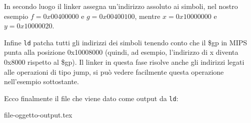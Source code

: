 \documentclass[class=book, crop=false, oneside]{standalone}
\begin{document}
In secondo luogo il linker assegna un'indirizzo assoluto ai simboli, nel nostro esempio $f=0x00400000$ e $g=0x00400100$, mentre $x=0x10000000$ e $y=0x10000020$.

Infine \texttt{ld} patcha tutti gli indirizzi dei simboli tenendo conto che il \$gp in MIPS punta alla posizione 0x10008000 (quindi, ad esempio, l'indirizzo di x diventa 0x8000 rispetto al \$gp). Il linker in questa fase risolve anche gli indirizzi legati alle operazioni di tipo jump, si può vedere facilmente questa operazione nell'esempio sottostante.

Ecco finalmente il file che viene dato come output da \texttt{ld}:
\begin{table}[H]
	{file-oggetto-output.tex}
	\caption{File di output}
\end{table}
\end{document}
